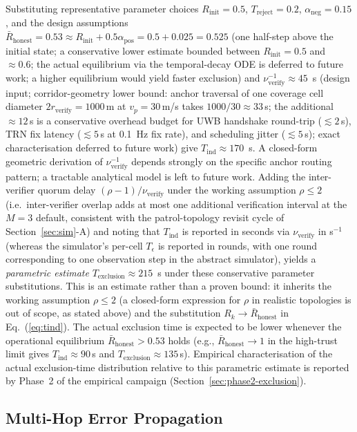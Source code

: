 \documentclass[journal,10pt,twocolumn]{IEEEtran}
\begin{document}
Substituting representative parameter choices $R_\text{init}=0.5$, $T_\text{reject}=0.2$, $\alpha_\text{neg}=0.15$, and the design assumptions $\bar{R}_\text{honest}=0.53 \approx R_\text{init} + 0.5\alpha_\text{pos} = 0.5 + 0.025 = 0.525$ (one half-step above the initial state; a conservative lower estimate bounded between $R_\text{init}=0.5$ and $\approx 0.6$; the actual equilibrium via the temporal-decay ODE is deferred to future work; a higher equilibrium would yield faster exclusion) and $\nu_\text{verify}^{-1}\approx 45$~s (design input; corridor-geometry lower bound: anchor traversal of one coverage cell diameter $2r_\text{verify}=1000$\,m at $v_p=30$\,m/s takes $1000/30 \approx 33$\,s; the additional $\approx 12$\,s is a conservative overhead budget for UWB handshake round-trip ($\lesssim 2$\,s), TRN fix latency ($\lesssim 5$\,s at 0.1~Hz fix rate), and scheduling jitter ($\lesssim 5$\,s); exact characterisation deferred to future work) give $T_\text{ind}\approx 170$~s. A closed-form geometric derivation of $\nu_\text{verify}^{-1}$ depends strongly on the specific anchor routing pattern; a tractable analytical model is left to future work. Adding the inter-verifier quorum delay $(\rho-1)/\nu_\text{verify}$ under the working assumption $\rho \leq 2$ (i.e.\ inter-verifier overlap adds at most one additional verification interval at the $M=3$ default, consistent with the patrol-topology revisit cycle of Section~\ref{sec:sim}-A) and noting that $T_\text{ind}$ is reported in seconds via $\nu_\text{verify}$ in s$^{-1}$ (whereas the simulator's per-cell $T_\epsilon$ is reported in rounds, with one round corresponding to one observation step in the abstract simulator), yields a \emph{parametric estimate} $T_\text{exclusion}\approx 215$~s under these conservative parameter substitutions. This is an estimate rather than a proven bound: it inherits the working assumption $\rho \leq 2$ (a closed-form expression for $\rho$ in realistic topologies is out of scope, as stated above) and the substitution $R_k \to \bar{R}_\text{honest}$ in Eq.~(\ref{eq:tind}). The actual exclusion time is expected to be lower whenever the operational equilibrium $\bar{R}_\text{honest} > 0.53$ holds (e.g., $\bar{R}_\text{honest}\to 1$ in the high-trust limit gives $T_\text{ind} \approx 90$\,s and $T_\text{exclusion}\approx 135$\,s). Empirical characterisation of the actual exclusion-time distribution relative to this parametric estimate is reported by Phase~2 of the empirical campaign (Section~\ref{sec:phase2-exclusion}).

\subsection{Multi-Hop Error Propagation}
\end{document}
